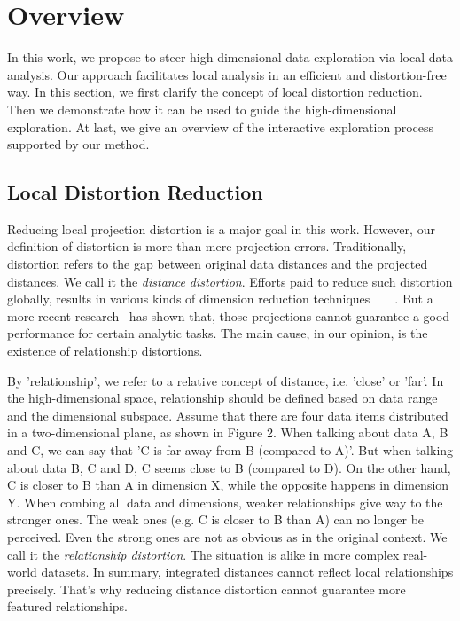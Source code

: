\section{Overview}
\label{section:overview}
In this work, we propose to steer high-dimensional data exploration via local data analysis. Our approach facilitates local analysis in an efficient and distortion-free way. In this section, we first clarify the concept of local distortion reduction. Then we demonstrate how it can be used to guide the high-dimensional exploration. At last, we give an overview of the interactive exploration process supported by our method.

\subsection{Local Distortion Reduction}
Reducing local projection distortion is a major goal in this work. However, our definition of distortion is more than mere projection errors. Traditionally, distortion refers to the gap between original data distances and the projected distances. We call it the \emph{distance distortion}. Efforts paid to reduce such distortion globally, results in various kinds of dimension reduction techniques~\cite{jolliffe2002principal}~\cite{borg2005modern}~\cite{tenenbaum2000global}~\cite{roweis2000nonlinear}. But a more recent research~\cite{DBLP:journals/tvcg/EtemadpourMPMOL15} has shown that, those projections cannot guarantee a good performance for certain analytic tasks. The main cause, in our opinion, is the existence of relationship distortions.

By 'relationship', we refer to a relative concept of distance, i.e. 'close' or 'far'. In the high-dimensional space, relationship should be defined based on data range and the dimensional subspace. Assume that there are four data items distributed in a two-dimensional plane, as shown in Figure 2. When talking about data A, B and C, we can say that 'C is far away from B (compared to A)'. But when talking about data B, C and D, C seems close to B (compared to D). On the other hand, C is closer to B than A in dimension X, while the opposite happens in dimension Y. When combing all data and dimensions, weaker relationships give way to the stronger ones. The weak ones (e.g. C is closer to B than A) can no longer be perceived. Even the strong ones are not as obvious as in the original context. We call it the \emph{relationship distortion}. The situation is alike in more complex real-world datasets. In summary, integrated distances cannot reflect local relationships precisely. That's why reducing distance distortion cannot guarantee more featured relationships.


